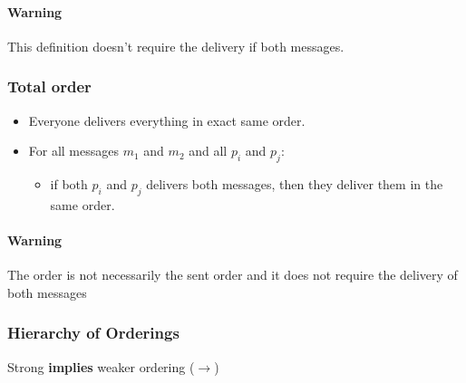\paragraph{Warning} This definition doesn't require the delivery if both messages.

\subsubsection{Total order}
\begin{itemize}
    \item Everyone delivers everything in exact same order.
    \item For all messages $m_1$ and $m_2$ and all $p_i$ and $p_j$:
        \begin{itemize}
            \item if both $p_i$ and $p_j$ delivers both messages,
                then they deliver them in the same order.
        \end{itemize}
\end{itemize}

\paragraph{Warning} The order is not necessarily the sent order and it does not
require the delivery of both messages

\subsubsection{Hierarchy of Orderings}

Strong \textbf{implies} weaker ordering ($\longrightarrow$)

